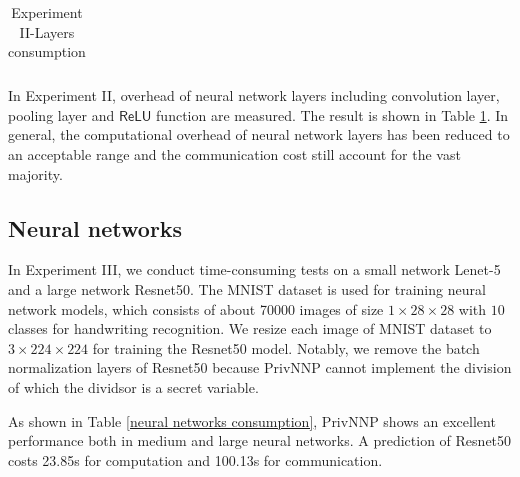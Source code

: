 \documentclass[letterpaper]{article} %
\begin{document}
\begin{table}[!ht]
{\begin{tabular}{|c|c|c|c|c|c|}
        \end{tabular}}

        \caption{Experiment II-Layers consumption}
        \label{Layers_consumption}
    \end{table}
    In Experiment II, overhead of neural network layers including
    convolution layer, pooling layer and $\mathsf{ReLU}$ function are measured.
    The result is shown in Table \ref{Layers_consumption}.
    In general, the computational overhead of neural network layers has been reduced to an acceptable range
    and the communication cost still account for the vast majority.


    \subsection{Neural networks}
    In Experiment III, we conduct
    time-consuming tests on a small network Lenet-5 \cite{Lenet5} and a large network Resnet50\cite{DeepResidualLearning}.
    The MNIST dataset \cite{MNIST} is used for training neural network models, which consists of about 70000 images of size $1\times 28 \times 28$ with $10$ classes
    for handwriting recognition.
    We resize each image of MNIST dataset to $3\times 224 \times 224$ for training the Resnet50 model.
    Notably, we remove the batch normalization layers of Resnet50 because PrivNNP
    cannot implement the division of which the dividsor is a secret variable.

    \begin{table}[!ht]
        \center
        \caption{Experiment III-Neural networks consumption}
        \label{neural networks consumption}
    \end{table}
    As shown in Table \ref{neural networks consumption}, PrivNNP shows an excellent performance
    both in medium and large neural networks.
    A prediction of Resnet50 costs 23.85s for computation and 100.13s for communication.
\end{document}
